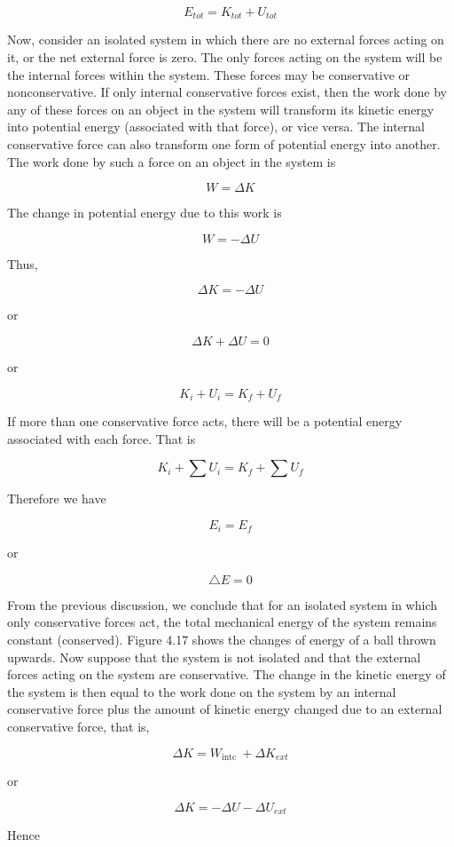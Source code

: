 \documentclass[10pt]{article}
\begin{document}
$$
E_{t o t}=K_{t o t}+U_{t o t}
$$

Now, consider an isolated system in which there are no external forces acting on it, or the net external force is zero. The only forces acting on the system will be the internal forces within the system. These forces may be conservative or nonconservative. If only internal conservative forces exist, then the work done by any of these forces on an object in the system will transform its kinetic energy into potential energy (associated with that force), or vice versa. The internal conservative force can also transform one form of potential energy into another. The work done by such a force on an object in the system is

$$
W=\Delta K
$$

The change in potential energy due to this work is

$$
W=-\Delta U
$$

Thus,

$$
\Delta K=-\Delta U
$$

or

$$
\Delta K+\Delta U=0
$$

or

$$
K_{i}+U_{i}=K_{f}+U_{f}
$$

If more than one conservative force acts, there will be a potential energy associated with each force. That is

$$
K_{i}+\sum U_{i}=K_{f}+\sum U_{f}
$$

Therefore we have

$$
E_{i}=E_{f}
$$

or

$$
\triangle E=0
$$

From the previous discussion, we conclude that for an isolated system in which only conservative forces act, the total mechanical energy of the system remains constant (conserved). Figure 4.17 shows the changes of energy of a ball thrown upwards. Now suppose that the system is not isolated and that the external forces acting on the system are conservative. The change in the kinetic energy of the system is then equal to the work done on the system by an internal conservative force plus the amount of kinetic energy changed due to an external conservative force, that is,

$$
\Delta K=W_{\text {intc }}+\Delta K_{e x t}
$$

or

$$
\Delta K=-\Delta U-\Delta U_{e x t}
$$

Hence
\end{document}
